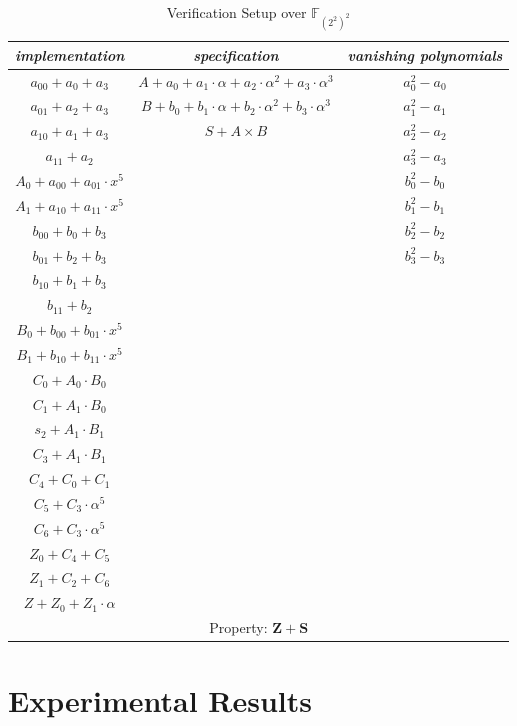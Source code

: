 \begin{Example}
	\begin{table}[t]
	\begin{center}
	\caption{Verification Setup over $\mathbb{F}_{(2^2)^2}$}\label{tab:masvercf}
	\begin{tabular}{|c | c|c|}
	\hline
	{\it implementation} & {\it specification} 	&  {\it vanishing polynomials}\\
	\hline
	$a_{00}+a_0+a_3$ & $A+a_0+a_1\cdot \alpha+a_2\cdot \alpha^2+a_3\cdot \alpha^3$   &$a_0^{2}-a_0$		\\
	$a_{01}+a_2+a_3$ & $B+b_0+b_1\cdot \alpha+b_2\cdot \alpha^2+b_3\cdot \alpha^3$ 	&$a_1^{2}-a_1$			\\
	$a_{10}+a_1+a_3$ &  $S+A\times B$ &$a_2^{2}-a_2$	\\
	$a_{11}+a_2$ &  &$a_3^{2}-a_3$	\\ 
	$A_0+a_{00}+a_{01} \cdot x^5$ & 	&$b_0^{2}-b_0$	\\ 
	$A_1+a_{10}+a_{11} \cdot x^5$ & 	&$b_1^{2}-b_1$\\
	$b_{00}+b_0+b_3$ & &$b_2^{2}-b_2$\\
	$b_{01}+b_2+b_3$ & &$b_3^{2}-b_3$\\
	$b_{10}+b_1+b_3$ & &\\
	$b_{11}+b_2$ & &\\
	$B_0+b_{00}+b_{01} \cdot x^5$ & &\\ 
	$B_1+b_{10}+b_{11} \cdot x^5$ & &\\
	$C_0 + A_0\cdot B_0$    &    &\\
	$C_1 + A_1\cdot B_0$		  &    \\
	$s_2 + A_1\cdot B_1$    &  &\\
	$C_3 + A_1\cdot B_1$		&  &\\
	$C_4 + C_0 + C_1$			& & \\
	$C_5 + C_3 \cdot \alpha ^5$	&  &\\
	$C_6 + C_3 \cdot \alpha ^5$	&  &\\
	$Z_0 + C_{4}+C_{5}$			& & \\
	$Z_{1}+C_{2}+C_{6}$			&  &\\ 
	$Z+Z_{0}+Z_{1}\cdot \alpha $ & &\\ 
	\hline
	\multicolumn{3}{|c|}{Property: $\mathbf{Z+S}$} \\
	\hline
	\end{tabular}
	\end{center}
	\end{table}

\end{Example}

\section{Experimental Results}\label{sec:experiment}

